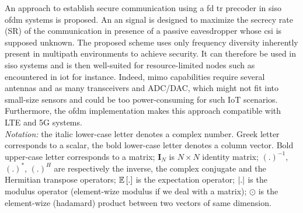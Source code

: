 An approach to establish secure communication using a \gls{fd} \gls{tr} precoder in \gls{siso} \gls{ofdm} systems is proposed. An \gls{an} signal is designed to maximize the secrecy rate (SR) of the communication in presence of a passive eavesdropper whose \gls{csi} is supposed unknown. The proposed scheme uses only frequency diversity inherently present in multipath environments to achieve security. It can therefore be used in \gls{siso} systems and is then well-suited for resource-limited nodes such as encountered in \gls{iot} for instance.  Indeed, \gls{mimo} capabilities require several antennas and as many transceivers and ADC/DAC, which might not fit into small-size sensors and could  be too power-consuming for such IoT scenarios. Furthermore, the \gls{ofdm} implementation makes this approach compatible with LTE and 5G systems. \\

\textit{Notation:} the italic lower-case letter denotes a complex number. Greek letter corresponds to a scalar, the bold lower-case letter denotes a column vector. Bold upper-case letter corresponds to a matrix; $\textbf{I}_N$ is $N \times N$ identity matrix; $(.)^{-1}$, $(.)^{*}$, $(.)^{H}$ are respectively the inverse, the complex conjugate and the Hermitian transpose operators; $\mathbb{E} \left[.\right]$ is the expectation operator; $\left|.\right|$ is the modulus operator (element-wize modulus if we deal with a matrix); $\odot$ is the element-wize (hadamard) product between two vectors of same dimension.